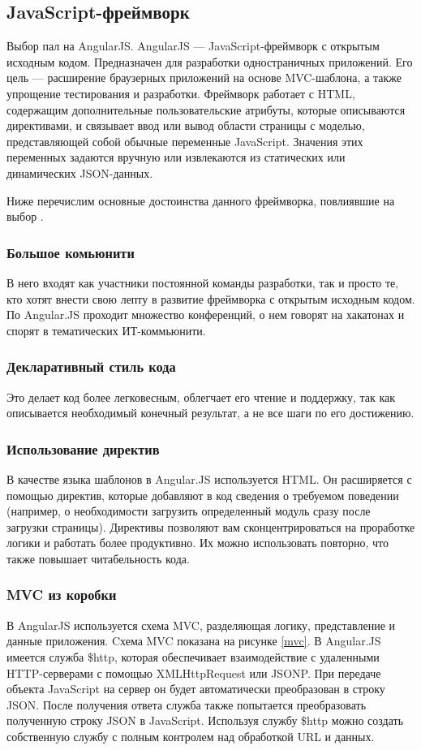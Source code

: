 \subsection{JavaScript-фреймворк}

Выбор пал на AngularJS. AngularJS — JavaScript-фреймворк с открытым исходным кодом.
Предназначен для разработки одностраничных приложений. Его цель — расширение браузерных
приложений на основе MVC-шаблона, а также упрощение тестирования и разработки.
Фреймворк работает с HTML, содержащим дополнительные пользовательские атрибуты,
которые описываются директивами, и связывает ввод или вывод области страницы с моделью,
представляющей собой обычные переменные JavaScript. Значения этих переменных задаются
вручную или извлекаются из статических или динамических JSON-данных.

Ниже перечислим основные достоинства данного фреймворка, повлиявшие на выбор \cite{angular}.

\subsubsection*{Большое комьюнити}
В него входят как участники постоянной команды разработки,
так и просто те, кто хотят внести свою лепту в развитие фреймворка с открытым исходным
кодом. По Angular.JS проходит множество конференций, о нем говорят на хакатонах и спорят
в тематических ИТ-коммьюнити.
\subsubsection*{Декларативный стиль кода}
Это делает код более легковесным, облегчает его чтение и поддержку, так как
описывается необходимый конечный результат, а не все шаги по его достижению.
\subsubsection*{Использование директив}
В качестве языка шаблонов в Angular.JS используется HTML. Он расширяется с помощью директив,
которые добавляют в код сведения о требуемом поведении (например, о необходимости загрузить
определенный модуль сразу после загрузки страницы). Директивы позволяют вам сконцентрироваться
на проработке логики и работать более продуктивно. Их можно использовать повторно, что
также повышает читабельность кода.
\subsubsection*{MVC из коробки}
В AngularJS используется схема MVC, разделяющая логику, представление и данные приложения.
Cхема MVC показана на рисунке \ref{mvc}.
В Angular.JS имеется служба \$http, которая обеспечивает взаимодействие с удаленными
HTTP-серверами с помощью XMLHttpRequest или JSONP. При передаче объекта JavaScript
на сервер он будет автоматически преобразован в строку JSON. После получения ответа
служба также попытается преобразовать полученную строку JSON в JavaScript.
Используя службу \$http можно создать собственную службу с полным контролем над
обработкой URL и данных.

